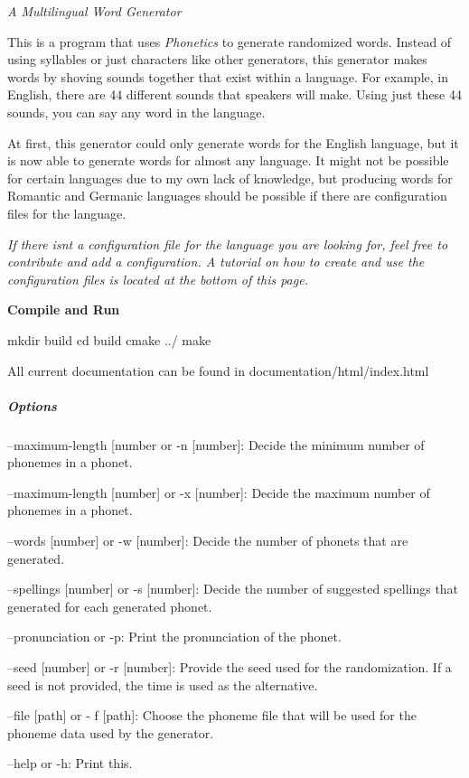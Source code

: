 {\itshape A Multilingual Word Generator}

This is a program that uses {\itshape Phonetics} to generate randomized words. Instead of using syllables or just characters like other generators, this generator makes words by shoving sounds together that exist within a language. For example, in English, there are 44 different sounds that speakers will make. Using just these 44 sounds, you can say any word in the language.

At first, this generator could only generate words for the English language, but it is now able to generate words for almost any language. It might not be possible for certain languages due to my own lack of knowledge, but producing words for Romantic and Germanic languages should be possible if there are configuration files for the language.

{\itshape If there isn\textquotesingle{}t a configuration file for the language you are looking for, feel free to contribute and add a configuration. A tutorial on how to create and use the configuration files is located at the bottom of this page.}

{\bfseries Compile and Run} 
\begin{DoxyCode}
mkdir build
cd build
cmake ../
make
\end{DoxyCode}


All current documentation can be found in documentation/html/index.\+html

\subparagraph*{Options}


\begin{DoxyItemize}
\item --maximum-\/length \mbox{[}number or -\/n \mbox{[}number\mbox{]}\+: Decide the minimum number of phonemes in a phonet.
\item --maximum-\/length \mbox{[}number\mbox{]} or -\/x \mbox{[}number\mbox{]}\+: Decide the maximum number of phonemes in a phonet.
\item --words \mbox{[}number\mbox{]} or -\/w \mbox{[}number\mbox{]}\+: Decide the number of phonets that are generated.
\item --spellings \mbox{[}number\mbox{]} or -\/s \mbox{[}number\mbox{]}\+: Decide the number of suggested spellings that generated for each generated phonet.
\item --pronunciation or -\/p\+: Print the pronunciation of the phonet.
\item --seed \mbox{[}number\mbox{]} or -\/r \mbox{[}number\mbox{]}\+: Provide the seed used for the randomization. If a seed is not provided, the time is used as the alternative.
\item --file \mbox{[}path\mbox{]} or -\/ f \mbox{[}path\mbox{]}\+: Choose the phoneme file that will be used for the phoneme data used by the generator.
\item --help or -\/h\+: Print this.
\end{DoxyItemize}

